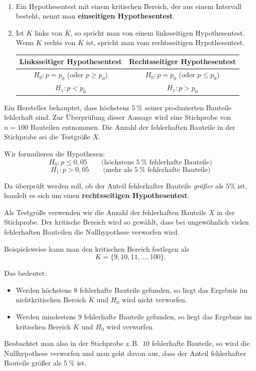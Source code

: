 \documentclass[ngerman, 12pt]{nssheetxea}
\begin{document}
\begin{definition} \
\begin{enumerate}
\item Ein Hypothesentest mit einem kritischen Bereich, der aus einem Intervall besteht, nennt man \textbf{einseitigen Hypothesentest}.
\item Ist $K$ links von $\overline{K}$, so spricht man von einem linksseitigen Hypothesentest. Wenn $K$ rechts von $\overline{K}$ ist, spricht man vom rechtsseitigen Hypothesentest.
\begin{center}

\begin{tabular}{ c c  }
\toprule
Linksseitiger Hypothesentest & Rechtsseitiger Hypothesentest \\
\midrule
$H_0:p=p_0$ (oder $p\geq p_0$) & $H_0:p=p_0$ (oder $p\leq p_0$) \\
$H_1: p<p_0$ & $H_1: p>p_0$ \\
\bottomrule
\end{tabular}
\end{center}
\end{enumerate}
\end{definition}

\begin{example}
Ein Hersteller behauptet, dass höchstens $\SI{5}{\percent}$ seiner produzierten Bauteile fehlerhaft sind. Zur Überprüfung dieser Aussage wird eine Stichprobe von $n=100$ Bauteilen entnommen. Die Anzahl der fehlerhaften Bauteile in der Stichprobe sei die Testgröße $X$.

Wir formulieren die Hypothesen:
\[
H_0: p \leq 0{,}05 \qquad \text{(höchstens $\SI{5}{\percent}$ fehlerhafte Bauteile)}
\]
\[
H_1: p > 0{,}05 \qquad \text{(mehr als $\SI{5}{\percent}$ fehlerhafte Bauteile)}
\]

Da überprüft werden soll, ob der Anteil fehlerhafter Bauteile \emph{größer} als $5\%$ ist, handelt es sich um einen \textbf{rechtsseitigen Hypothesentest}.

Als Testgröße verwenden wir die Anzahl der fehlerhaften Bauteile $X$ in der Stichprobe. Der kritische Bereich wird so gewählt, dass bei ungewöhnlich vielen fehlerhaften Bauteilen die Nullhypothese verworfen wird.

Beispielsweise kann man den kritischen Bereich festlegen als
\[
K=\{9,10,11,\dots,100\}.
\]

Das bedeutet:
\begin{itemize}
\item Werden höchstens $8$ fehlerhafte Bauteile gefunden, so liegt das Ergebnis im nichtkritischen Bereich $\overline{K}$ und $H_0$ wird nicht verworfen.
\item Werden mindestens $9$ fehlerhafte Bauteile gefunden, so liegt das Ergebnis im kritischen Bereich $K$ und $H_0$ wird verworfen.
\end{itemize}

Beobachtet man also in der Stichprobe z.\,B.\ $10$ fehlerhafte Bauteile, so wird die Nullhypothese verworfen und man geht davon aus, dass der Anteil fehlerhafter Bauteile größer als $\SI{5}{\percent}$ ist.
\label{Bsp:Hypothesentest}
\end{example}
\end{document}

